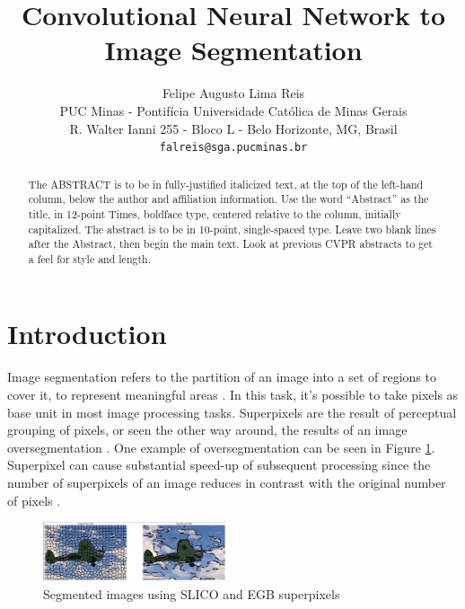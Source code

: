 \documentclass[10pt,twocolumn,letterpaper]{article}
\begin{document}
\title{Convolutional Neural Network to Image Segmentation}

\author{Felipe Augusto Lima Reis\\
PUC Minas - Pontif\'icia Universidade Cat\'olica de Minas Gerais\\
R. Walter Ianni 255 - Bloco L - Belo Horizonte, MG, Brasil\\
{\tt\small falreis@sga.pucminas.br}
}

\maketitle

\begin{abstract}
   The ABSTRACT is to be in fully-justified italicized text, at the top
   of the left-hand column, below the author and affiliation
   information. Use the word ``Abstract'' as the title, in 12-point
   Times, boldface type, centered relative to the column, initially
   capitalized. The abstract is to be in 10-point, single-spaced type.
   Leave two blank lines after the Abstract, then begin the main text.
   Look at previous CVPR abstracts to get a feel for style and length.
\end{abstract}

\section{Introduction}

Image segmentation refers to the partition of an image into a set of regions to cover it, to represent meaningful areas \cite{DOMINGUEZ}. In this task, it's possible to take pixels as base unit in most image processing tasks\cite{WANG201728}.  Superpixels are the result of perceptual grouping of pixels, or seen the other way around, the results of an image oversegmentation \cite{WANG201728}. One example of oversegmentation can be seen in Figure \ref{fig:superpixel}. Superpixel can cause substantial speed-up of subsequent processing since the number of superpixels of an image reduces in contrast with the original number of pixels \cite{WANG201728}.

\begin{figure}[ht]
  \centering
  \includegraphics[width=0.48\textwidth]{superpixels.png}
  \caption{Segmented images using SLICO and EGB superpixels}
  \label{fig:superpixel}
\end{figure}
\end{document}
